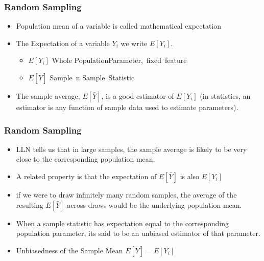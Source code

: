 \documentclass{beamer}
\begin{document}
\begin{frame}
\frametitle{Random Sampling}
\begin{itemize}
	\item Population mean of a variable is called mathematical expectation
	\item The Expectation of a variable $Y_i$ we write $E[Y_i]$.
		\begin{itemize}
			\item[\textbullet] $E[Y_i]$ \triangleright Whole Population\triangleright Parameter,\ fixed\ feature\\
		\end{itemize}
		\begin{itemize}
			\item[\textbullet] $E[\bar{Y}]$ \triangleright Sample\ n \triangleright Sample\ Statistic \\
		\end{itemize}
	\item The sample average, $E[\bar{Y}]$, is a good estimator of $E[Y_i]$ (in statistics, an estimator is any
function of sample data used to estimate parameters).
	
\end{itemize}

\end{frame}


\begin{frame}
\frametitle{Random Sampling}

\begin{itemize}
	\item LLN tells us that in large samples, the sample average is likely to be very close to the corresponding population mean.
	\item  A related property is that the expectation of $E[\bar{Y}]$ is also $E[Y_i]$
	\item if we were to draw infinitely many random samples, the average of the resulting $E[\bar{Y}]$ across
draws would be the underlying population mean.
	\item When a sample statistic has expectation equal to the corresponding population parameter, its said to be an unbiased estimator of that parameter.
	\item Unbiasedness of the Sample Mean $E[\bar{Y}] = E[Y_i]$
\end{itemize}

\end{frame}
\end{document}
